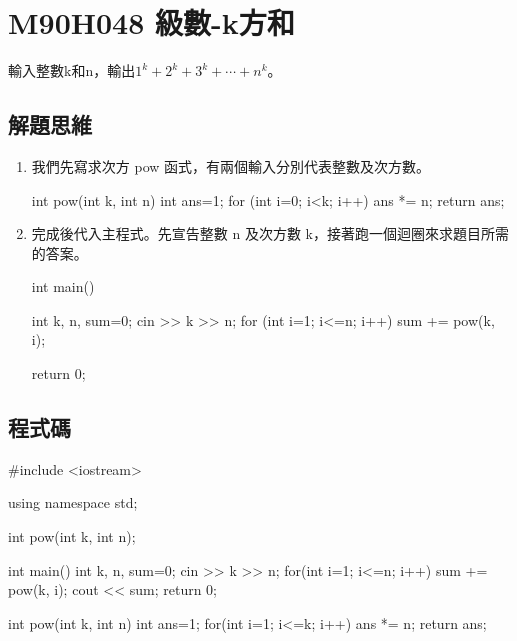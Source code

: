 \section{M90H048 級數-k方和}
輸入整數k和n，輸出$1^{k}+2^{k}+3^{k}+\cdots+n^{k}$。
\subsection{解題思維}

\begin{enumerate}
	\item
	我們先寫求次方 pow 函式，有兩個輸入分別代表整數及次方數。
	\begin{inside}
	int pow(int k, int n) {
		int ans=1;
		for (int i=0; i<k; i++) ans *= n;
		return ans;
	}
	\end{inside}
	\item
	完成後代入主程式。先宣告整數 n 及次方數 k，接著跑一個迴圈來求題目所需的答案。
	\begin{inside}
		int main()
		{
			int k, n, sum=0;
			cin >> k >> n;
			for (int i=1; i<=n; i++) sum += pow(k, i);
							
			return 0;
		}			
	\end{inside}
\end{enumerate} 

\subsection{程式碼}
\begin{cppcode}
	#include <iostream>

	using namespace std;
	
	int pow(int k, int n);
	
	int main()
	{
		int k, n, sum=0;
		cin >> k >> n;
		for(int i=1; i<=n; i++) sum += pow(k, i);
		cout << sum;
		return 0;
	}
	
	int pow(int k, int n) {
		int ans=1;
		for(int i=1; i<=k; i++) ans *= n;
		return ans;
	}
\end{cppcode}
